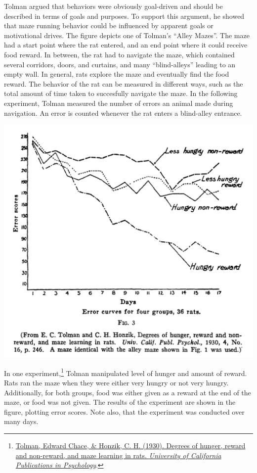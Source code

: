 \documentclass[
  oneside,
  12pt]{crumpbook}
\newenvironment{floatrightbox50}{%
  \wrapfigure{R}{.5\textwidth}%
  }{%
  \endwrapfigure}
\begin{document}
Tolman argued that behaviors were obviously goal-driven and should be described in terms of goals and purposes. To support this argument, he showed that maze running behavior could be influenced by apparent goals or motivational drives. The figure depicts one of Tolman's ``Alley Mazes''. The maze had a start point where the rat entered, and an end point where it could receive food reward. In between, the rat had to navigate the maze, which contained several corridors, doors, and curtains, and many ``blind-alleys'' leading to an empty wall. In general, rats explore the maze and eventually find the food reward. The behavior of the rat can be measured in different ways, such as the total amount of time taken to succesfully navigate the maze. In the following experiment, Tolman measured the number of errors an animal made during navigation. An error is counted whenever the rat enters a blind-alley entrance.

\begin{floatrightbox50}
\includegraphics[width=1\linewidth]{imgs/Tolman_hunger}

\end{floatrightbox50}

In one experiment,\footnote{\protect\hyperlink{ref-tolmanDegreesHungerReward1930}{Tolman, Edward Chace, \& Honzik, C. H. (1930). Degrees of hunger, reward and non-reward, and maze learning in rats. \emph{University of California Publications in Psychology}}.} Tolman manipulated level of hunger and amount of reward. Rats ran the maze when they were either very hungry or not very hungry. Additionally, for both groups, food was either given as a reward at the end of the maze, or food was not given. The results of the experiment are shown in the figure, plotting error scores. Note also, that the experiment was conducted over many days.
\end{document}
